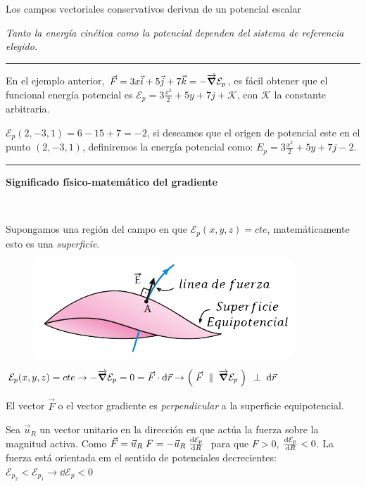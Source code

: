 \begin{small}
\begin{myexampleblock}{Los campos vectoriales conservativos derivan de un potencial escalar}
 
\vspace{2mm} \emph{Tanto la energía cinética como la potencial dependen del sistema de referencia elegido.}

\rule{150pt}{0.4pt} 

En el ejemplo anterior, $\vec F = 3x\vec i + 5 \vec j+7\vec k=\displaystyle - \overrightarrow{\grad} \mathcal E_p$, es fácil obtener que el funcional energía potencial es $\mathcal E_p=3\frac{x^2}2+5y+7j+\mathcal K$, con $\mathcal K$ la constante arbitraria.

$\mathcal E_p(2,-3,1)=6-15+7=-2$, si deseamos que el origen de potencial este en el punto $(2,-3,1)$, definiremos la energía potencial como: $E_p=3\frac{x^2}2+5y+7j-2$.

\rule{150pt}{0.4pt} 


\vspace{2mm} \textbf{Significado físico-matemático del gradiente}
\label{potenciales-decrecientes}
\begin{multicols}{2}
$\, $

Supongamos una región del campo en que $\mathcal E_p(x,y,z)=cte$, matemáticamente esto es una \emph{superficie}.
\begin{figure}[H]
		\centering
		\includegraphics[width=.5\textwidth]{imagenes/img02-19.png}
		\end{figure}
\end{multicols}

\vspace{2mm} $\mathcal E_p(x,y,z)=cte \to - \overrightarrow{\grad} \mathcal E_p = 0 = \vec F \cdot \dd \vec r \to \left( \; \vec F \;\parallel \; \overrightarrow{\grad}  \mathcal E_p \; \right) \; \; \bot \; \; \dd \vec r$

\vspace{2mm} El vector $\vec F$ o el vector gradiente es \emph{perpendicular} a la superficie equipotencial.

\begin{multicols}{2}
\vspace{2mm} Sea $\vec u_R$ un vector unitario en la dirección en que actúa la fuerza sobre la magnitud activa. Como
$\vec F = \vec u_R \; F=- \vec u_R \; \dv{\mathcal E_p}{R}\;$
para que $F>0$, $\dv{\mathcal E_p}{R} <0$. La fuerza está orientada em el sentido de potenciales decrecientes: $\mathcal E_{p_2} < \mathcal E_{p_1} \to \dd \mathcal E_p < 0$


\end{multicols}
\end{myexampleblock}
\end{small}
